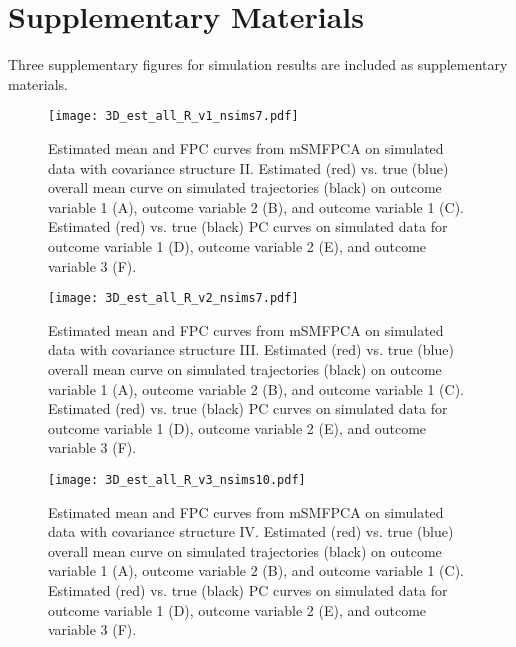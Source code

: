 \documentclass[aoas,preprint]{imsart}
\theoremstyle{remark}
\newcommand{\beginsupplement}{%
        \setcounter{table}{0}
        \renewcommand{\thetable}{S\arabic{table}}%
        \setcounter{figure}{0}
        \renewcommand{\thefigure}{S\arabic{figure}}%
     }
\begin{document}
\beginsupplement
\section*{Supplementary Materials}
Three supplementary figures for simulation results are included as supplementary materials. 


\begin{figure}[h]
 \centerline{\texttt{[image: 3D\_est\_all\_R\_v1\_nsims7.pdf]}}
\caption{Estimated mean and FPC curves from mSMFPCA on simulated data with covariance structure II. Estimated (red) vs. true (blue) overall mean curve on simulated trajectories (black) on outcome variable 1 (A), outcome variable 2 (B), and outcome variable 1 (C). Estimated (red) vs. true (black) PC curves on simulated data for outcome variable 1 (D), outcome variable 2 (E), and outcome variable 3 (F).}
\label{f:figS1}
\end{figure}

\begin{figure}[h]
 \centerline{\texttt{[image: 3D\_est\_all\_R\_v2\_nsims7.pdf]}}
\caption{Estimated mean and FPC curves from mSMFPCA on simulated data with covariance structure III. Estimated (red) vs. true (blue) overall mean curve on simulated trajectories (black) on outcome variable 1 (A), outcome variable 2 (B), and outcome variable 1 (C). Estimated (red) vs. true (black) PC curves on simulated data for outcome variable 1 (D), outcome variable 2 (E), and outcome variable 3 (F).}
\label{f:figS2}
\end{figure}

\begin{figure}[h]
 \centerline{\texttt{[image: 3D\_est\_all\_R\_v3\_nsims10.pdf]}}
\caption{Estimated mean and FPC curves from mSMFPCA on simulated data with covariance structure IV. Estimated (red) vs. true (blue) overall mean curve on simulated trajectories (black) on outcome variable 1 (A), outcome variable 2 (B), and outcome variable 1 (C). Estimated (red) vs. true (black) PC curves on simulated data for outcome variable 1 (D), outcome variable 2 (E), and outcome variable 3 (F).}
\label{f:figS3}
\end{figure}
\end{document}
